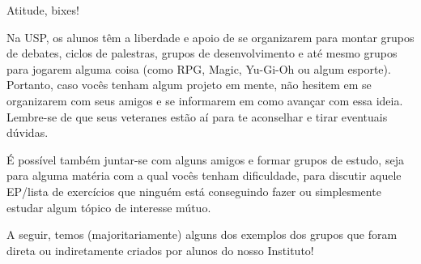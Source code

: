 \begin{secao}{Atitude, bixes!}

Na USP, os alunos têm a liberdade e apoio de se organizarem
para montar grupos de debates, ciclos de palestras, grupos
de desenvolvimento e até mesmo grupos para jogarem alguma coisa (como
RPG, Magic, Yu-Gi-Oh ou algum esporte).
Portanto, caso vocês tenham algum projeto em mente, não hesitem
em se organizarem com seus amigos e se informarem em como avançar com essa
ideia. Lembre-se de que seus veteranes estão aí para te aconselhar e tirar
eventuais dúvidas.

É possível também juntar-se com alguns amigos e formar grupos de
estudo, seja para alguma matéria com a qual vocês tenham dificuldade, para
discutir aquele EP/lista de exercícios que ninguém está conseguindo
fazer ou simplesmente estudar algum tópico de interesse mútuo.

A seguir, temos (majoritariamente) alguns dos exemplos dos grupos que foram 
direta ou indiretamente criados por alunos do nosso Instituto!





















\pagebreak


\end{secao}
